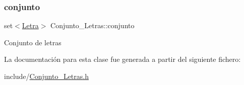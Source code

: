 \subsubsection{\texorpdfstring{conjunto}{conjunto}}
{\footnotesize\ttfamily set$<$\hyperlink{classLetra}{Letra}$>$ Conjunto\+\_\+\+Letras\+::conjunto\hspace{0.3cm}{\ttfamily [private]}}

Conjunto de letras 

La documentación para esta clase fue generada a partir del siguiente fichero\+:\begin{DoxyCompactItemize}
\item 
include/\hyperlink{Conjunto__Letras_8h}{Conjunto\+\_\+\+Letras.\+h}\end{DoxyCompactItemize}
